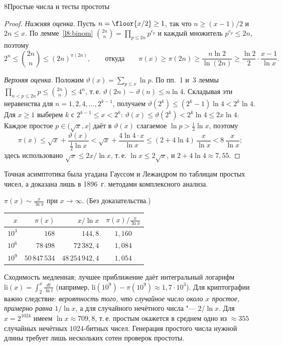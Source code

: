 \begin{lecture}{8}{Простые числа и тесты простоты}
\begin{proof}
\emph{Нижняя оценка.} Пусть $n = \floor{x/2} \ge 1$, так что $n \ge (x - 1)/2$ и $2n \le x$.
По лемме~\ref{l8:binom} $\binom{2n}{n} = \prod_{p \le 2n} p^{e_p}$ и каждый множитель
$p^{e_p} \le 2n$, поэтому
\[
  2^n \le \binom{2n}{n} \le (2n)^{\pi(2n)}, \qquad\text{откуда}\qquad
  \pi(x) \ge \pi(2n) \ge \frac{n \ln 2}{\ln (2n)} \ge \frac{\ln 2}{2} \cdot \frac{x - 1}{\ln x}.
\]

\emph{Верхняя оценка.} Положим $\vartheta(x) = \sum_{p \le x} \ln p$. По пп.~1 и~3 леммы
$\prod_{n < p \le 2n} p \le \binom{2n}{n} \le 4^n$, т.\,е. $\vartheta(2n) - \vartheta(n) \le n \ln 4$.
Складывая эти неравенства для $n = 1, 2, 4, \ldots, 2^{k-1}$, получаем
$\vartheta(2^k) \le (2^k - 1) \ln 4 < 2^k \ln 4$. Для $x \ge 1$ выберем $k$ с
$2^{k-1} \le x < 2^k$: $\vartheta(x) \le \vartheta(2^k) < 2^k \ln 4 \le 2x \ln 4$.
Каждое простое $p \in (\sqrt x, x]$ даёт в $\vartheta(x)$ слагаемое $\ln p > \frac12 \ln x$,
поэтому
\[
  \pi(x) \le \sqrt x + \frac{\vartheta(x)}{\frac12 \ln x} < \sqrt x + \frac{4 \ln 4 \cdot x}{\ln x}
  \le (2 + 4\ln 4)\,\frac{x}{\ln x} < 8\,\frac{x}{\ln x};
\]
здесь использовано $\sqrt x \le 2x / \ln x$, т.\,е. $\ln x \le 2\sqrt x$, и $2 + 4\ln 4 \approx 7{,}55$.
\end{proof}

Точная асимптотика была угадана Гауссом и Лежандром по таблицам простых чисел, а доказана лишь
в 1896~г. методами комплексного анализа.

\begin{theorem}
\label{l8:pnt}
$\displaystyle \pi(x) \sim \frac{x}{\ln x}$ при $x \to \infty$. \textup{(Без доказательства.)}
\end{theorem}

\begin{center}
\begin{tabular}{r|r|r|c}
  $x$ & $\pi(x)$ & $x / \ln x$ & $\pi(x) \big/ \frac{x}{\ln x}$ \\ \hline
  $10^3$ & $168$ & $144{,}8$ & $1{,}160$ \\
  $10^6$ & $78\,498$ & $72\,382{,}4$ & $1{,}084$ \\
  $10^9$ & $50\,847\,534$ & $48\,254\,942{,}4$ & $1{,}054$
\end{tabular}
\end{center}

Сходимость медленная; лучшее приближение даёт интегральный логарифм
$\mathrm{li}(x) = \int_2^x \frac{dt}{\ln t}$ (например, $\mathrm{li}(10^9) - \pi(10^9) \approx 1{,}7 \cdot 10^3$).
Для криптографии важно следствие: \emph{вероятность того, что случайное число около $x$ простое,
примерно равна $1/\ln x$}, а для случайного нечётного числа "--- $2/\ln x$. Для $x = 2^{1024}$
имеем $\ln x \approx 709{,}8$, т.\,е. простым окажется в среднем одно из $\approx 355$
случайных нечётных $1024$-битных чисел. Генерация простого числа нужной длины требует
лишь нескольких сотен проверок простоты.


\end{lecture}
